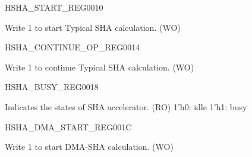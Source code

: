\begin{register}{H}{SHA\_START\_REG}{\hexprefix{}0010}\label{regdesc:SHASTARTREG}
%
%
\regnewline%
\begin{regdesc}\begin{reglist}
\label{fielddesc:SHASTART}\item [SHA\_START] Write 1 to start Typical SHA calculation. (WO)
\end{reglist}\end{regdesc}
\end{register}


\begin{register}{H}{SHA\_CONTINUE\_OP\_REG}{\hexprefix{}0014}\label{regdesc:SHACONTINUEREG}
%
%
\regnewline%
\begin{regdesc}\begin{reglist}
\label{fielddesc:SHACONTINUE}\item [SHA\_CONTINUE\_OP] Write 1 to continue Typical SHA calculation. (WO)
\end{reglist}\end{regdesc}
\end{register}


\begin{register}{H}{SHA\_BUSY\_REG}{\hexprefix{}0018}\label{regdesc:SHABUSYREG}
%
%
\regnewline%
\begin{regdesc}\begin{reglist}
\label{fielddesc:SHABUSYSTATE}\item [SHA\_BUSY\_STATE] Indicates the states of SHA accelerator. (RO)
1'h0: idle
1'h1: busy
\end{reglist}\end{regdesc}
\end{register}


\begin{register}{H}{SHA\_DMA\_START\_REG}{\hexprefix{}001C}\label{regdesc:SHADMASTARTREG}
%
%
\regnewline%
\begin{regdesc}\begin{reglist}
\label{fielddesc:SHADMASTART}\item [SHA\_DMA\_START] Write 1 to start DMA-SHA calculation. (WO)
\end{reglist}\end{regdesc}
\end{register}


